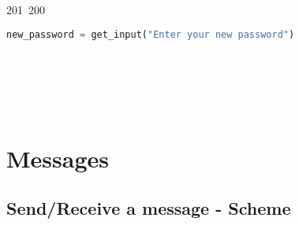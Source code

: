 201~200~\documentclass{article}
\begin{document}
\begin{lstlisting}[language=Python, caption=Change Password]
	                                                                                                                                                                            new_password = get_input("Enter your new password")
	                                                                                                                                                                                new_user_key = crypto.derive_user_key_from_password(user.username, new_password)
	                                                                                                                                                                                    new_hashed_user_key = crypto.hash_user_key(new_user_key)
	                                                                                                                                                                                        encrypted_private_key, nonce = crypto.encrypt_private_key(new_user_key, private_key)

	                                                                                                                                                                                            server.modify_password(user.username, hashed_password, encrypted_private_key, nonce, new_hashed_user_key) # Assuming we already have a user session with the server and connected with TLS
	                                                                                                                                                                                                print("Password updated successfully!")
	                                                                                                                                                                                                \end{lstlisting}


	                                                                                                                                                                                                \section{Messages}

	                                                                                                                                                                                                \subsection{Send/Receive a message - Scheme} 
\end{document}
